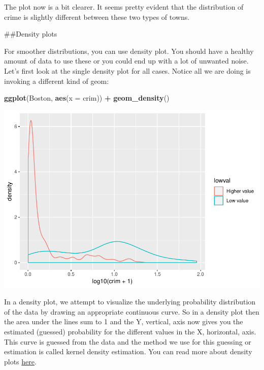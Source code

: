 \documentclass[]{book}
\newenvironment{Shaded}{\begin{snugshade}}{\end{snugshade}}
\newcommand{\DataTypeTok}[1]{\textcolor[rgb]{0.13,0.29,0.53}{#1}}
\newcommand{\KeywordTok}[1]{\textcolor[rgb]{0.13,0.29,0.53}{\textbf{#1}}}
\newcommand{\NormalTok}[1]{#1}
\newcommand{\OperatorTok}[1]{\textcolor[rgb]{0.81,0.36,0.00}{\textbf{#1}}}
\newcommand{\StringTok}[1]{\textcolor[rgb]{0.31,0.60,0.02}{#1}}
\theoremstyle{definition}
\theoremstyle{definition}
\theoremstyle{definition}
\theoremstyle{remark}
\begin{document}
The plot now is a bit clearer. It seems pretty evident that the
distribution of crime is slightly different between these two types of
towns.

\#\#Density plots

For smoother distributions, you can use density plot. You should have a
healthy amount of data to use these or you could end up with a lot of
unwanted noise. Let's first look at the single density plot for all
cases. Notice all we are doing is invoking a different kind of geom:

\begin{Shaded}
\begin{Highlighting}[]
\KeywordTok{ggplot}\NormalTok{(Boston, }\KeywordTok{aes}\NormalTok{(}\DataTypeTok{x =}\NormalTok{ crim)) }\OperatorTok{+}
\StringTok{  }\KeywordTok{geom_density}\NormalTok{() }
\end{Highlighting}
\end{Shaded}

\includegraphics{03-visualisation_files/figure-latex/unnamed-chunk-24-1.pdf}

In a density plot, we attempt to visualize the underlying probability
distribution of the data by drawing an appropriate continuous curve. So
in a density plot then the area under the lines sum to 1 and the Y,
vertical, axis now gives you the estimated (guessed) probability for the
different values in the X, horizontal, axis. This curve is guessed from
the data and the method we use for this guessing or estimation is called
kernel density estimation. You can read more about density plots
\href{https://serialmentor.com/dataviz/histograms-density-plots.html}{here}.
\end{document}
